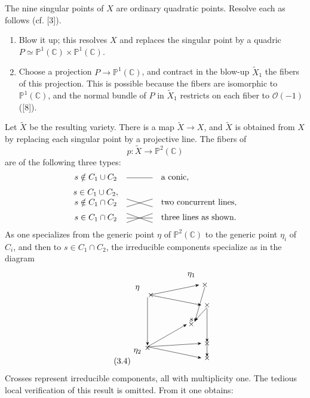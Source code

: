 \documentclass[10pt]{article}
\newcommand{\C}{\mathbb C}
\newcommand{\Pj}{\mathbb P}
\begin{document}
The nine singular points of \(X\) are ordinary quadratic points. Resolve each as follows (cf. [3]).
\begin{enumerate}[label=\alph*)]
\item Blow it up; this resolves \(X\) and replaces the singular point by a quadric \(P\simeq\Pj^1(\C)\times\Pj^1(\C)\).
\item Choose a projection \(P\to\Pj^1(\C)\), and contract in the blow-up \(\widetilde X_1\) the fibers of this projection. This is possible because the fibers are isomorphic to \(\Pj^1(\C)\), and the normal bundle of \(P\) in \(\widetilde X_1\) restricts on each fiber to \(\mathcal O(-1)\) ([8]).
\end{enumerate}
Let \(\widetilde X\) be the resulting variety. There is a map \(\widetilde X\to X\), and \(\widetilde X\) is obtained from \(X\) by replacing each singular point by a projective line. The fibers of
\[
p:\widetilde X\longrightarrow\Pj^2(\C)
\]
are of the following three types:
\[
\begin{array}{ccl}
s\notin C_1\cup C_2 & \begin{tikzpicture}[baseline=-0.5ex,scale=.55]\draw (-1,0)--(1,0);\end{tikzpicture} & \text{a conic},\\[0.6em]
s\in C_1\cup C_2,\\ s\notin C_1\cap C_2 & \begin{tikzpicture}[baseline=-0.5ex,scale=.55]\draw (-1,-.3)--(1,.3);\draw (-1,.3)--(1,-.3);\end{tikzpicture} & \text{two concurrent lines},\\[0.6em]
s\in C_1\cap C_2 & \begin{tikzpicture}[baseline=-0.5ex,scale=.55]\draw (-1,-.35)--(1,.35);\draw (-1,.35)--(1,-.35);\draw (-1,0)--(1,0);\end{tikzpicture} & \text{three lines as shown.}
\end{array}
\]
As one specializes from the generic point \(\eta\) of \(\Pj^2(\C)\) to the generic point \(\eta_i\) of \(C_i\), and then to \(s\in C_1\cap C_2\), the irreducible components specialize as in the diagram
\[
\tag{3.4}
\begin{tikzpicture}[scale=0.95,>=Stealth]
\node at (0,1.4) {$\eta$};
\node at (2.4,2.0) {$\eta_1$};
\node at (0,-1.4) {$\eta_2$};
\node at (2.4,0) {$s$};
\foreach \x/\y in {0.6/1.1,3.0/1.55,3.1/.65,2.4/-.2,0.45/-1.25,3.1/-1.05,3.1/-1.7}{\node at (\x,\y) {$\times$};}
\draw[->] (0.55,1.1)--(2.75,1.55);
\draw[->] (0.55,1.1)--(2.85,.65);
\draw[->] (0.45,-1.2)--(2.2,-.2);
\draw[->] (0.45,-1.2)--(2.85,-1.05);
\draw[->] (0.45,-1.2)--(2.85,-1.7);
\draw[->] (3.0,1.45)--(2.55,-.1);
\draw[->] (3.1,.55)--(2.55,-.05);
\draw[->] (3.1,.5)--(3.1,-1.0);
\draw[->] (3.1,-1.05)--(3.1,-1.65);
\draw[->] (0.45,1.0)--(0.45,-1.15);
\end{tikzpicture}
\]
Crosses represent irreducible components, all with multiplicity one. The tedious local verification of this result is omitted. From it one obtains:
\end{document}
